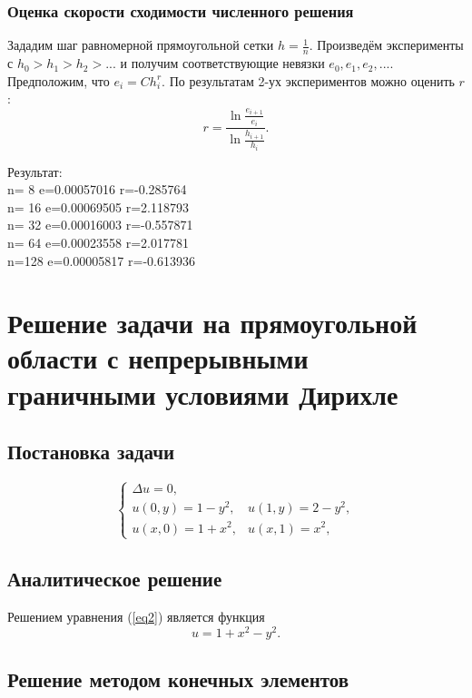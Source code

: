 \documentclass{report}
\begin{document}
\subsection{Оценка скорости сходимости численного решения}
Зададим шаг равномерной прямоугольной сетки $h=\frac{1}{n}$. Произведём эксперименты с $h_0>h_1>h_2>...$ и получим соответствующие невязки $e_0, e_1, e_2, ...$. Предположим, что $e_i=Ch_i^r$. По результатам 2-ух экспериментов можно оценить $r$:
\begin{equation}
	r = \frac{\ln{\frac{e_{i+1}}{e_i}}}{\ln{\frac{h_{i+1}}{h_i}}}.
\end{equation}
\begin{center}
Результат:\\
n=  8 e=0.00057016 r=-0.285764\\
n= 16 e=0.00069505 r=2.118793\\
n= 32 e=0.00016003 r=-0.557871\\
n= 64 e=0.00023558 r=2.017781\\
n=128 e=0.00005817 r=-0.613936\\
\end{center}

\chapter{Решение задачи на прямоугольной области с непрерывными граничными условиями Дирихле}
\section{Постановка задачи}
\begin{equation}\label{eq2}
	\begin{cases}
		\Delta u = 0, \\
		u(0, y) = 1-y^2,&u(1, y)=2-y^2,\\
		u(x, 0) = 1+x^2,&u(x, 1)=x^2,
	\end{cases}
\end{equation}

\section{Аналитическое решение}
Решением уравнения (\ref{eq2}) является функция
\begin{equation}
	u=1+x^2-y^2.
\end{equation}

\section{Решение методом конечных элементов}
\end{document}
